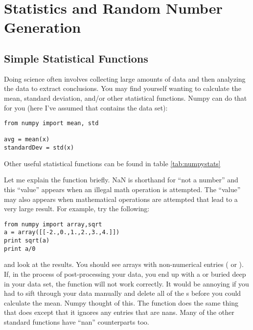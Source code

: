 \chapter{Statistics and Random Number Generation}

\label{chap:Statistics}
\section{Simple Statistical Functions}
Doing science often involves collecting large amounts of data and then
analyzing the data to extract conclusions.  You may find yourself
wanting to calculate the mean, standard deviation, and/or other
statistical functions.  Numpy can do that for you (here I've assumed
that  contains the data set):
\begin{Verbatim}
from numpy import mean, std

avg = mean(x)
standardDev = std(x)
\end{Verbatim}
Other useful statistical functions can be found in table \ref{tab:numpystats}


Let me explain the function  briefly.  NaN is shorthand
for ``not a number'' and this ``value'' appears when an illegal math
operation is attempted. The ``value''  may also appears when
  mathematical operations are attempted that lead to a very large
  result.  For example, try the following:
\begin{Verbatim}
from numpy import array,sqrt
a = array([[-2.,0.,1.,2.,3.,4.]])
print sqrt(a)
print a/0
\end{Verbatim}
and look at the results.  You should see arrays with non-numerical
entries ( or ).  If, in the process of
post-processing your data, you end up with a  or 
buried deep in your data set, the function  will not work correctly.
It would be annoying if you had to sift through your
data manually and delete all of the s before you could
calculate the mean.  Numpy thought of this.  The function
 does the same thing that  does except that it
ignores any entries that are nans.  Many of the other
standard functions have ``nan'' counterparts too.


